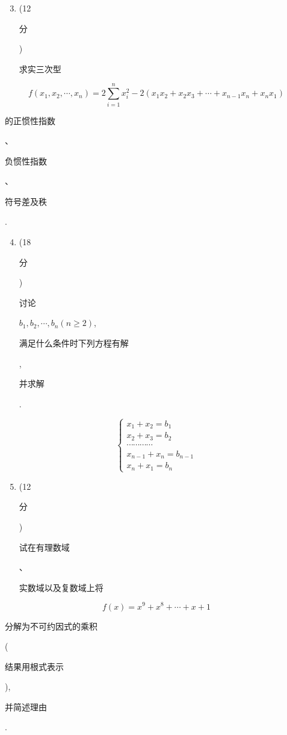 \documentclass[10pt]{article}
\begin{document}
\begin{enumerate}
  \setcounter{enumi}{2}
  \item (12 \begin{CJK}{UTF8}{mj}分\end{CJK}) \begin{CJK}{UTF8}{mj}求实三次型\end{CJK}
\end{enumerate}
$$
f\left(x_{1}, x_{2}, \cdots, x_{n}\right)=2 \sum_{i=1}^{n} x_{i}^{2}-2\left(x_{1} x_{2}+x_{2} x_{3}+\cdots+x_{n-1} x_{n}+x_{n} x_{1}\right)
$$
\begin{CJK}{UTF8}{mj}的正惯性指数\end{CJK}、\begin{CJK}{UTF8}{mj}负惯性指数\end{CJK}、\begin{CJK}{UTF8}{mj}符号差及秩\end{CJK}.

\begin{enumerate}
  \setcounter{enumi}{3}
  \item (18 \begin{CJK}{UTF8}{mj}分\end{CJK}) \begin{CJK}{UTF8}{mj}讨论\end{CJK} $b_{1}, b_{2}, \cdots, b_{n}(n \geqslant 2)$, \begin{CJK}{UTF8}{mj}满足什么条件时下列方程有解\end{CJK}, \begin{CJK}{UTF8}{mj}并求解\end{CJK}.
\end{enumerate}
$$
\left\{\begin{array}{l}
x_{1}+x_{2}=b_{1} \\
x_{2}+x_{3}=b_{2} \\
\cdots \cdots \cdots \cdots \\
x_{n-1}+x_{n}=b_{n-1} \\
x_{n}+x_{1}=b_{n}
\end{array}\right.
$$

\begin{enumerate}
  \setcounter{enumi}{4}
  \item (12 \begin{CJK}{UTF8}{mj}分\end{CJK}) \begin{CJK}{UTF8}{mj}试在有理数域\end{CJK}、\begin{CJK}{UTF8}{mj}实数域以及复数域上将\end{CJK}
\end{enumerate}
$$
f(x)=x^{9}+x^{8}+\cdots+x+1
$$
\begin{CJK}{UTF8}{mj}分解为不可约因式的乘积\end{CJK} (\begin{CJK}{UTF8}{mj}结果用根式表示\end{CJK}), \begin{CJK}{UTF8}{mj}并简述理由\end{CJK}.
\end{document}
